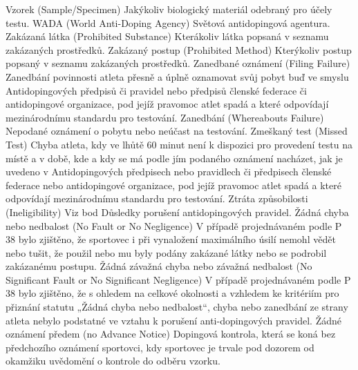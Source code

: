\dend
\dt Vzorek (Sample/Specimen)
\dd Jakýkoliv biologický materiál odebraný pro účely testu.
\dend
\dt WADA (World Anti-Doping Agency)
\dd Světová antidopingová agentura.
\dend
\dt Zakázaná látka (Prohibited Substance)
\dd Kterákoliv látka popsaná v seznamu zakázaných prostředků.
\dend
\dt Zakázaný postup (Prohibited Method)
\dd Kterýkoliv postup popsaný v seznamu zakázaných prostředků.
\dend
\dt Zanedbané oznámení (Filing Failure)
\dd Zanedbání povinnosti atleta přesně a úplně oznamovat svůj pobyt buď ve smyslu Antidopingových předpisů či pravidel nebo předpisů členské federace či antidopingové organizace, pod jejíž pravomoc atlet spadá a které odpovídají mezinárodnímu standardu pro testování.
\dend
\dt Zanedbání (Whereabouts Failure)
\dd Nepodané oznámení o pobytu nebo neúčast na testování.
\dend
\dt Zmeškaný test (Missed Test)
\dd Chyba atleta, kdy ve lhůtě 60 minut není k dispozici pro provedení testu na místě a v době, kde a kdy se má podle jím podaného oznámení nacházet, jak je uvedeno v Antidopingových předpisech nebo pravidlech či předpisech členské federace nebo antidopingové organizace, pod jejíž pravomoc atlet spadá a které odpovídají mezinárodnímu standardu pro testování.
\dend
\dt Ztráta způsobilosti (Ineligibility)
\dd Viz bod Důsledky porušení antidopingových pravidel.
\dend
\dt Žádná chyba nebo nedbalost (No Fault or No Negligence)
\dd V případě projednávaném podle P 38 bylo zjištěno, že sportovec i při vynaložení maximálního úsilí nemohl vědět nebo tušit, že použil nebo mu byly podány zakázané látky nebo se podrobil zakázanému postupu.
\dend
\dt Žádná závažná chyba nebo závažná nedbalost (No Significant Fault or No Significant Negligence)
\dd V případě projednávaném podle P 38 bylo zjištěno, že s ohledem na celkové okolnosti a vzhledem ke kritériím pro přiznání statutu „Žádná chyba nebo nedbalost“, chyba nebo zanedbání ze strany atleta nebylo podstatné ve vztahu k porušení anti-dopingových pravidel.
\dend
\dt Žádné oznámení předem (no Advance Notice)
\dd Dopingová kontrola, která se koná bez předchozího oznámení sportovci, kdy sportovec je trvale pod dozorem od okamžiku uvědomění o kontrole do odběru vzorku.
\dend

\endinput